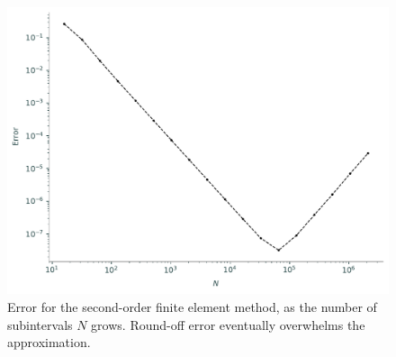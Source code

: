 \begin{figure}[ht]
\centering
\includegraphics[width=\textwidth]{figures/FEM_error_2nd_order.pdf}
\caption{Error for the second-order finite element method, as the number of subintervals $N$ grows.
Round-off error eventually overwhelms the approximation.}
\label{fig:FEM_error_2nd_order}
\end{figure}